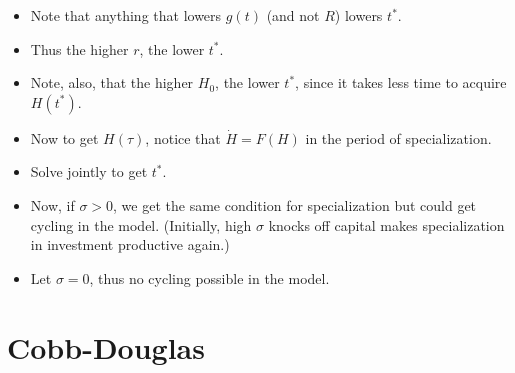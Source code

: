 \documentclass[12pt,compress,handout]{beamer}  %
\begin{document}
\begin{frame}
\begin{itemize}
\item Note that anything that lowers $g(t)$ (and not $R$) lowers $t^*$.\\[5mm]
\item Thus the higher $r$, the lower $t^*$.\\[5mm]
\item Note, also, that the higher $H_0$, the lower $t^*$, since it takes less time to acquire $H(t^*)$.
\end{itemize}
\end{frame}


\begin{frame}

\begin{itemize}
\item
Now to get $H(\tau)$, notice that $\dot{H}=F(H)$ in the period of
specialization.\\[3mm]

\item
Solve jointly to
get $t^{*}$.\\[3mm]

\item
Now, if $\sigma > 0$, we get the same condition for specialization but could
get cycling in the model. (Initially, high $\sigma$ knocks off
capital makes specialization in investment productive again.)\\[3mm]

\item
Let $\sigma=0$, thus no cycling possible in the model.
\end{itemize}

\end{frame}


\section{Cobb-Douglas}
\end{document}
